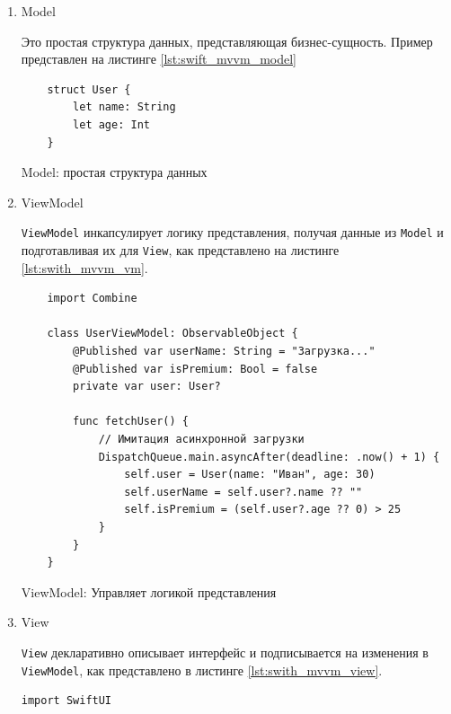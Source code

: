 \documentclass[14pt, russian]{scrartcl}
\begin{document}
\begin{enumerate}
    \item Model

    Это простая структура данных, представляющая бизнес-сущность. Пример представлен на листинге \ref{lst:swift_mvvm_model}

    \begin{listing}[H]
    \begin{verbatim}
    struct User {
        let name: String
        let age: Int
    }
    \end{verbatim}
    \caption{Model: простая структура данных}
    \label{lst:swift_mvvm_model}
    \end{listing}

    \item ViewModel

    \texttt{ViewModel} инкапсулирует логику представления, получая данные из \texttt{Model} и подготавливая их для \texttt{View}, как представлено на листинге \ref{lst:swith_mvvm_vm}.

    \begin{listing}[H]
    \begin{verbatim}
    import Combine

    class UserViewModel: ObservableObject {
        @Published var userName: String = "Загрузка..."
        @Published var isPremium: Bool = false
        private var user: User?

        func fetchUser() {
            // Имитация асинхронной загрузки
            DispatchQueue.main.asyncAfter(deadline: .now() + 1) {
                self.user = User(name: "Иван", age: 30)
                self.userName = self.user?.name ?? ""
                self.isPremium = (self.user?.age ?? 0) > 25
            }
        }
    }
    \end{verbatim}
    \caption{ViewModel: Управляет логикой представления}
    \label{lst:swith_mvvm_vm}
    \end{listing}

    \item View

    \texttt{View} декларативно описывает интерфейс и подписывается на изменения в \texttt{ViewModel}, как представлено в листинге \ref{lst:swith_mvvm_view}.

    \begin{listing}[H]
    \begin{verbatim}
import SwiftUI


\end{verbatim}
\end{listing}
\end{enumerate}
\end{document}
